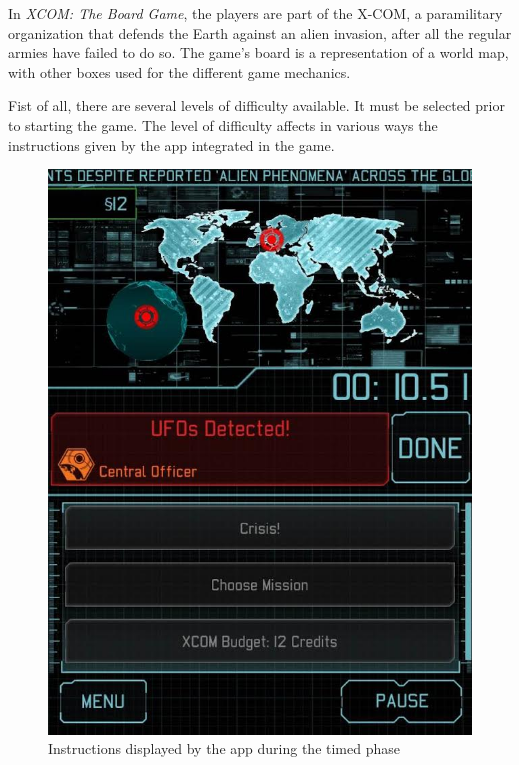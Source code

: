 In \textit{XCOM: The Board Game}, the players are part of the X-COM, a paramilitary organization that defends the Earth against an alien invasion, after all the regular armies have failed to do so. The game's board is a representation of a world map, with other boxes used for the different game mechanics.

Fist of all, there are several levels of difficulty available. It must be selected prior to starting the game. The level of difficulty affects in various ways the instructions given by the app integrated in the game.

\begin{figure}[h]
    \centering
    \includegraphics[scale=0.3]{Images/xcom_boardgame_app.jpg}
    \caption{Instructions displayed by the app during the timed phase}
    \label{fig:XCOMAPP}
\end{figure}



